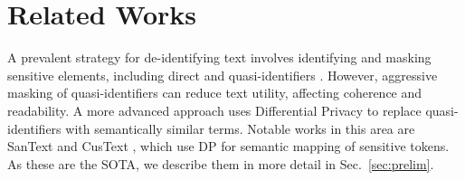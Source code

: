 \documentclass[11pt]{article}
\newcommand{\clusant}{CluSanT\xspace}
\begin{document}
    



\section{Related Works}

A prevalent strategy for de-identifying text involves identifying and masking sensitive elements, including direct and quasi-identifiers \cite{pilan2022text,presidio}. However, aggressive masking of quasi-identifiers can reduce text utility, affecting coherence and readability. 
A more advanced approach uses Differential Privacy to replace quasi-identifiers with semantically similar terms. Notable works in this area are SanText \cite{yue2021differential} and CusText \cite{chen2023customized}, which use DP for semantic mapping of sensitive tokens. As these are the SOTA, we describe them in more detail in Sec.~\ref{sec:prelim}.
\end{document}
